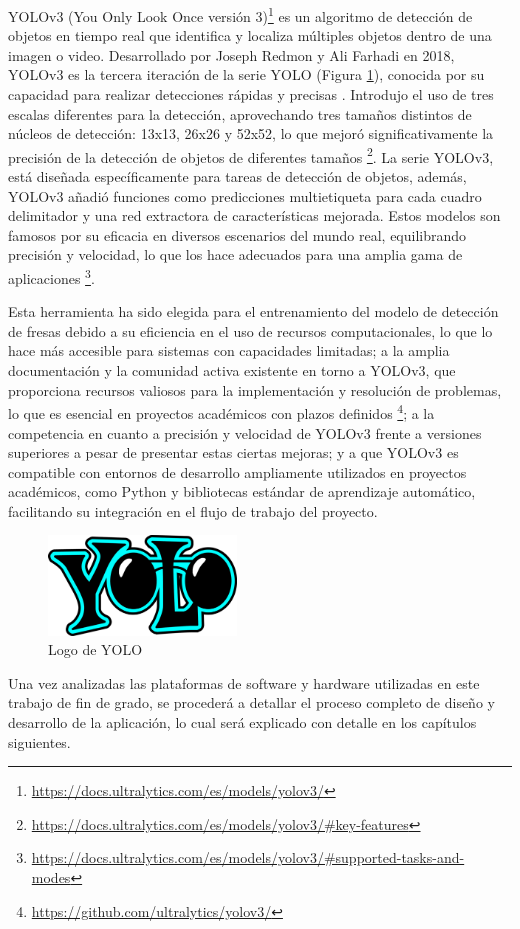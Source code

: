 YOLOv3 (You Only Look Once versión 3)\footnote{\url{https://docs.ultralytics.com/es/models/yolov3/}} es un algoritmo de detección de objetos en tiempo real que identifica y localiza múltiples objetos dentro de una imagen o video. Desarrollado por Joseph Redmon y Ali Farhadi en 2018, YOLOv3 es la tercera iteración de la serie YOLO (Figura \ref{fig:YOLO_Logo}), conocida por su capacidad para realizar detecciones rápidas y precisas \cite{Redmon18}. Introdujo el uso de tres escalas diferentes para la detección, aprovechando tres tamaños distintos de núcleos de detección: 13x13, 26x26 y 52x52, lo que mejoró significativamente la precisión de la detección de objetos de diferentes tamaños \footnote{\url{https://docs.ultralytics.com/es/models/yolov3/\#key-features}}. La serie YOLOv3, está diseñada específicamente para tareas de detección de objetos, además, YOLOv3 añadió funciones como predicciones multietiqueta para cada cuadro delimitador y una red extractora de características mejorada. Estos modelos son famosos por su eficacia en diversos escenarios del mundo real, equilibrando precisión y velocidad, lo que los hace adecuados para una amplia gama de aplicaciones \footnote{\url{https://docs.ultralytics.com/es/models/yolov3/\#supported-tasks-and-modes}}.

Esta herramienta ha sido elegida para el entrenamiento del modelo de detección de fresas debido a su eficiencia en el uso de recursos computacionales, lo que lo hace más accesible para sistemas con capacidades limitadas; a la amplia documentación y la comunidad activa existente en torno a YOLOv3, que proporciona recursos valiosos para la implementación y resolución de problemas, lo que es esencial en proyectos académicos con plazos definidos \footnote{\url{https://github.com/ultralytics/yolov3/}}; a la competencia en cuanto a precisión y velocidad de YOLOv3 frente a versiones superiores a pesar de presentar estas ciertas mejoras; y a que YOLOv3 es compatible con entornos de desarrollo ampliamente utilizados en proyectos académicos, como Python y bibliotecas estándar de aprendizaje automático, facilitando su integración en el flujo de trabajo del proyecto.

\begin{figure} [H]
    \begin{center}
      \includegraphics[width=5cm]{figs/yolo_logo.png}
    \end{center}
    \caption{Logo de YOLO}
    \label{fig:YOLO_Logo}
\end{figure}

\pagebreak
Una vez analizadas las plataformas de software y hardware utilizadas en este trabajo de fin de grado, se procederá a detallar el proceso completo de diseño y desarrollo de la aplicación, lo cual será explicado con detalle en los capítulos siguientes.






